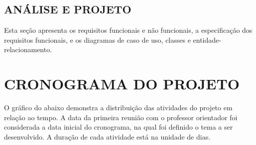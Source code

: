 
\section{ANÁLISE E PROJETO}
\label{chap:analise}
Esta seção apresenta os requisitos funcionais e não funcionais, a especificação dos requisitos funcionais, e os diagramas de caso de uso, classes e entidade-relacionamento.


\clearpage


\clearpage


\clearpage


\clearpage


\clearpage


\clearpage


\clearpage


\clearpage


\chapter{CRONOGRAMA DO PROJETO}


O gráfico do abaixo demonstra a distribuição das atividades do projeto em relação ao tempo. A data da primeira reunião com o professor orientador foi considerada a data inicial do cronograma, na qual foi definido o tema a ser desenvolvido. A duração de cada atividade está na unidade de dias.

